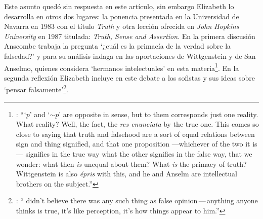 Este asunto quedó sin respuesta en este artículo, sin embargo Elizabeth lo desarrolla en otros dos lugares: la ponencia presentada en la Universidad de Navarra en 1983 con el título \emph{Truth} y otra lección ofrecida en \emph{John Hopkins University} en 1987 titulada: \emph{Truth, Sense and Assertion}. En la primera discusión Anscombe trabaja la pregunta \enquote*{¿cuál es la primacía de la verdad sobre la falsedad?} y para su análisis indaga en las aportaciones de Wittgenstein y de San Anselmo, quienes considera `hermanos intelectuales' en esta materia\footnote{\cite[Cf.~][73]{anscombe2011plato:truth}: \enquote{`$p$' and `${\sim}p$' are opposite in sense, but to them corresponds just one reality. What reality? Well, the fact, the \emph{res enunciata} by the true one. This comes so close to saying that truth and falsehood are a sort of equal relations between sign and thing signified, and that one proposition ---whichever of the two it is--- signifies in the true way what the other signifies in the false way, that we wonder: what then \emph{is} unequal about them? What \emph{is} the primacy of truth? Wittgenstein is also \emph{épris} with this, and he and Anselm are intellectual brothers on the subject.}}. En la segunda reflexión Elizabeth incluye en este debate a los sofistas y sus ideas sobre `pensar falsamente'\footnote{\cite[264]{anscombe2015logic:tsa}: \enquote{ didn't believe there was any such thing as false opinion\,---\,anything anyone thinks is true, it's like perception, it's how things appear to him.}}.

